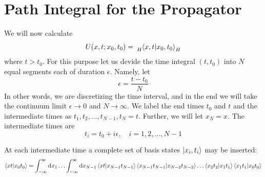 	\section{Path Integral for the Propagator}
		We will now calculate
		\begin{equation}
			U(x,t;x_0, t_0) = \tensor[_H]{\braket{x,t}{x_0, t_0}}{_H}
			\label{chapter12.eqn1-propagator-path-integral}
		\end{equation}
		where $t>t_0$. For this purpose let us devide the time integral $(t,t_0)$ into $N$ equal segments each of duration $\epsilon$. Namely, let
		\begin{equation}
			\epsilon = \frac{t-t_0}{N}
			\label{chapter12.eqn2-propagator-path-integral}
		\end{equation}
		In other words, we are discretizing the time interval, and in the end we will take the continuum limit $\epsilon\rightarrow 0$ and $N\rightarrow \infty$. We label the end times $t_0$ and $t$ and the intermediate times as $t_1, t_2, \ldots, t_{N-1}, t_N=t$. Further, we will let $x_N=x$. The intermediate times are 
		\begin{equation}
			t_i=t_0+i \epsilon, \quad i=1,2,\ldots,N-1
			\label{chapter12.eqn3-propagator-path-integral}
		\end{equation}
		
		At each intermediate time a complete set of basis states $\ket{x_i,t_i}$ may be inserted:
		\begin{equation}
			\braket{x t}{x_0 t_0} =\int_{-\infty}^{\infty}\dd{x_1} \ldots \int_{-\infty}^{\infty} \dd{x_{N-1}} \braket{x t}{x_{N-1} t_{N-1}}\braket{x_{N-1} t_{N-1}}{x_{N-2} t_{N-2}} \ldots \braket{x_2 t_2}{x_{1} t_{1}} \braket{x_1 t_1}{x_{0} t_{0}}
			\label{chapter12.eqn4-propagator-path-integral}
		\end{equation}
		
